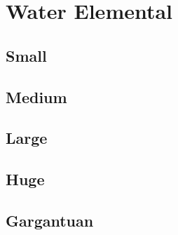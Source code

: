 \section{Water Elemental}

\subsection{Small}

\subsection{Medium}

\subsection{Large}

\subsection{Huge}

\subsection{Gargantuan}
